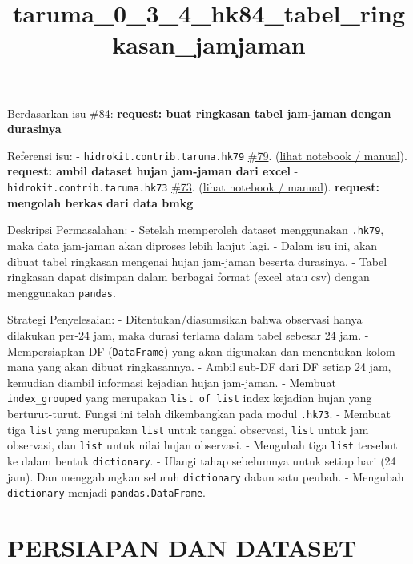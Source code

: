 \documentclass[11pt]{article}
\title{taruma\_0\_3\_4\_hk84\_tabel\_ringkasan\_jamjaman}
\begin{document}
    
    \maketitle
    
    

    
    Berdasarkan isu
\href{https://github.com/taruma/hidrokit/issues/84}{\#84}:
\textbf{request: buat ringkasan tabel jam-jaman dengan durasinya}

Referensi isu: - \texttt{hidrokit.contrib.taruma.hk79}
\href{https://github.com/taruma/hidrokit/issues/79}{\#79}.
(\href{https://nbviewer.jupyter.org/gist/taruma/05dab67fac8313a94134ac02d0398897}{lihat
notebook / manual}). \textbf{request: ambil dataset hujan jam-jaman dari
excel} - \texttt{hidrokit.contrib.taruma.hk73}
\href{https://github.com/taruma/hidrokit/issues/73}{\#73}.
(\href{https://nbviewer.jupyter.org/gist/taruma/b00880905f297013f046dad95dc2e284}{lihat
notebook / manual}). \textbf{request: mengolah berkas dari data bmkg}

Deskripsi Permasalahan: - Setelah memperoleh dataset menggunakan
\texttt{.hk79}, maka data jam-jaman akan diproses lebih lanjut lagi. -
Dalam isu ini, akan dibuat tabel ringkasan mengenai hujan jam-jaman
beserta durasinya. - Tabel ringkasan dapat disimpan dalam berbagai
format (excel atau csv) dengan menggunakan \texttt{pandas}.

Strategi Penyelesaian: - Ditentukan/diasumsikan bahwa observasi hanya
dilakukan per-24 jam, maka durasi terlama dalam tabel sebesar 24 jam. -
Mempersiapkan DF (\texttt{DataFrame}) yang akan digunakan dan menentukan
kolom mana yang akan dibuat ringkasannya. - Ambil sub-DF dari DF setiap
24 jam, kemudian diambil informasi kejadian hujan jam-jaman. - Membuat
\texttt{index\_grouped} yang merupakan \texttt{list\ of\ list} index
kejadian hujan yang berturut-turut. Fungsi ini telah dikembangkan pada
modul \texttt{.hk73}. - Membuat tiga \texttt{list} yang merupakan
\texttt{list} untuk tanggal observasi, \texttt{list} untuk jam
observasi, dan \texttt{list} untuk nilai hujan observasi. - Mengubah
tiga \texttt{list} tersebut ke dalam bentuk \texttt{dictionary}. -
Ulangi tahap sebelumnya untuk setiap hari (24 jam). Dan menggabungkan
seluruh \texttt{dictionary} dalam satu peubah. - Mengubah
\texttt{dictionary} menjadi \texttt{pandas.DataFrame}.

    \hypertarget{persiapan-dan-dataset}{%
\section{PERSIAPAN DAN DATASET}\label{persiapan-dan-dataset}}
\end{document}

